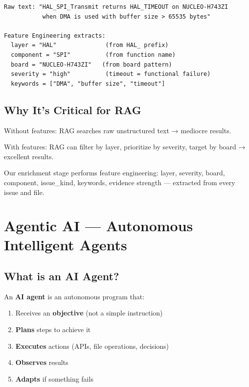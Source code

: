 \documentclass[11pt,a4paper]{report}
\begin{document}
\begin{lstlisting}
Raw text: "HAL_SPI_Transmit returns HAL_TIMEOUT on NUCLEO-H743ZI 
           when DMA is used with buffer size > 65535 bytes"

Feature Engineering extracts:
  layer = "HAL"              (from HAL_ prefix)
  component = "SPI"          (from function name)
  board = "NUCLEO-H743ZI"   (from board pattern)
  severity = "high"          (timeout = functional failure)
  keywords = ["DMA", "buffer size", "timeout"]
\end{lstlisting}

\section{Why It's Critical for RAG}

Without features: RAG searches raw unstructured text → mediocre results.

With features: RAG can filter by layer, prioritize by severity, target by board → excellent results.

\begin{projectbox}
Our enrichment stage performs feature engineering: layer, severity, board, component, issue\_kind, keywords, evidence strength --- extracted from every issue and file.
\end{projectbox}

\chapter{Agentic AI --- Autonomous Intelligent Agents}

\section{What is an AI Agent?}

An \textbf{AI agent} is an autonomous program that:
\begin{enumerate}
    \item Receives an \textbf{objective} (not a simple instruction)
    \item \textbf{Plans} steps to achieve it
    \item \textbf{Executes} actions (APIs, file operations, decisions)
    \item \textbf{Observes} results
    \item \textbf{Adapts} if something fails
\end{enumerate}
\end{document}
